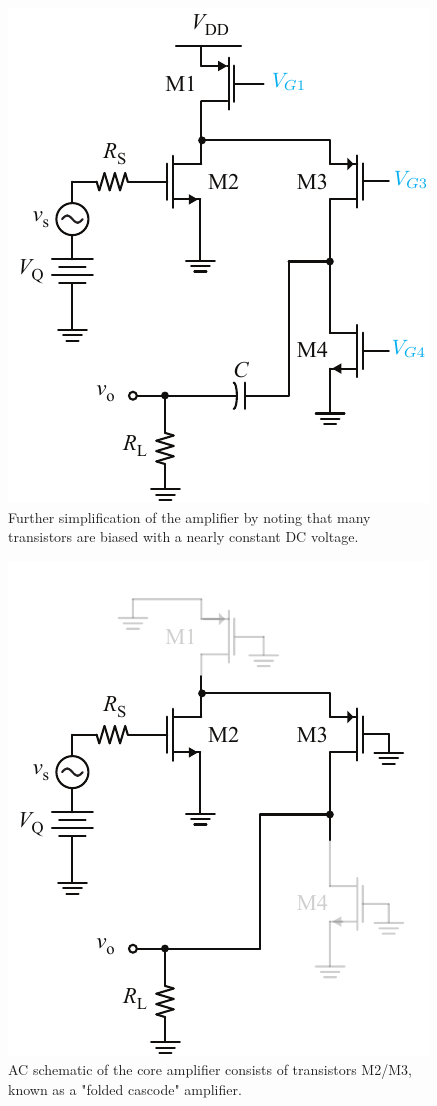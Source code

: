 \newpage
\begin{figure}[t]
\centering
\includegraphics[scale=1]{18cascode_folded_dc}
\caption{Further simplification of the amplifier by noting that many transistors are biased with a nearly constant DC voltage.}
\label{fig:18cascode_folded_dc}
\end{figure}
\begin{figure}[H]
\centering
\includegraphics[scale=1]{19cascode_folded_ac}
\caption{AC schematic of the core amplifier consists of transistors M2/M3, known as a "folded cascode" amplifier.}
\label{fig:19cascode_folded_ac}
\end{figure}
